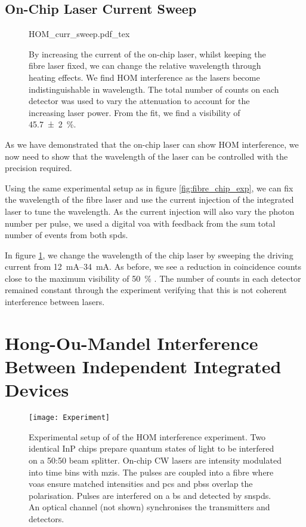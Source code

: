 \subsection{On-Chip Laser Current Sweep}

\begin{figure}[tp]
	\centering
	\small
	\def\svgwidth{0.8\textwidth} 
	{HOM_curr_sweep.pdf_tex}
	\caption[Hong-Ou-Mandel dip between fibre components and chip by varying laser current]{By increasing the current of the on-chip laser, whilst keeping the fibre laser fixed, we can change the relative wavelength through heating effects. We find \ac{HOM} interference as the lasers become indistinguishable in wavelength. The total number of counts on each detector was used to vary the attenuation to account for the increasing laser power. From the fit, we find a visibility of \SI{45.7(20)}{\percent}.}
	\label{fig:fibre_curr_sweep}
\end{figure}

As we have demonstrated that the on-chip laser can show \ac{HOM} interference, we now need to show that the wavelength of the laser can be controlled with the precision required.

Using the same experimental setup as in figure \ref{fig:fibre_chip_exp}, we can fix the wavelength of the fibre laser and use the current injection of the integrated laser to tune the wavelength. As the current injection will also vary the photon number per pulse, we used a digital \ac{voa} with feedback from the sum total number of events from both \acp{spd}. 

In figure \ref{fig:fibre_curr_sweep}, we change the wavelength of the chip laser by sweeping the driving current from \SIrange{12}{34}{mA}. As before, we see a reduction in coincidence counts close to the maximum visibility of \SI{50}{\percent} \cite{Rarity2005}. The number of counts in each detector remained constant through the experiment verifying that this is not coherent interference between lasers.

\section{Hong-Ou-Mandel Interference Between Independent Integrated Devices}

\begin{figure}[tp]
	\centering
	\texttt{[image: Experiment]}
	\caption[Hong-Ou-Mandel interference experimental setup]{Experimental setup of of the \ac{HOM} interference experiment. Two identical \ac{InP} chips prepare quantum states of light to be interfered on a {50:50} beam splitter. On-chip \ac{CW} lasers are intensity modulated into time bins with \acp{mzi}. The pulses are coupled into a fibre where \acfp{voa} ensure matched intensities and \acfp{pc} and \acfp{pbs} overlap the polarisation. Pulses are interfered on a \acf{bs} and detected by \acfp{snspd}. An optical channel (not shown) synchronises the transmitters and detectors.}
	\label{fig:hom_experiment}
\end{figure}

